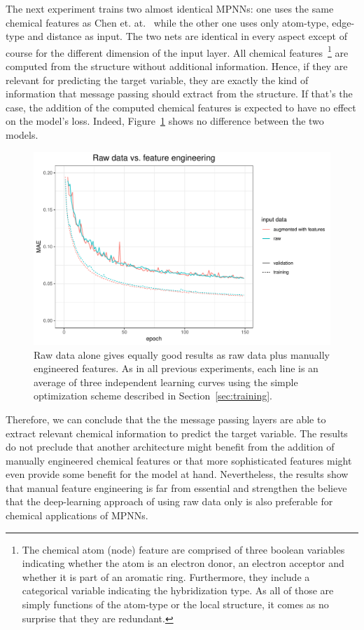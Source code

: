 The next experiment trains two almost identical MPNNs: one uses the same chemical features as Chen et. at.~\cite{Chen2019} while the other one uses only atom-type, edge-type and distance as input. The two nets are identical in every aspect except of course for the different dimension of the input layer. All chemical features~\footnote{
	The chemical atom (node) feature are comprised of three boolean variables indicating whether the atom is an electron donor, an electron acceptor and whether it is part of an aromatic ring. Furthermore, they include a categorical variable indicating the hybridization type. As all of those are simply functions of the atom-type or the local structure, it comes as no surprise that they are redundant.
	
}
are computed from the structure without additional information. Hence, if they are relevant for predicting the target variable, they are exactly the kind of information that message passing should extract from the structure. If that's the case, the addition of the computed chemical features is expected to have no effect on the model's loss. Indeed, Figure~\ref{fig:raw-data} shows no difference between the two models.

\begin{figure}[H]
	\includegraphics[width=\linewidth]{figures/raw-data}
	\caption{Raw data alone gives equally good results as raw data plus manually engineered features. As in all previous experiments, each line is an average of three independent learning curves using the simple optimization scheme described in Section~\ref{sec:training}.}
	\label{fig:raw-data}
\end{figure}

Therefore, we can conclude that the the message passing layers are able to extract relevant chemical information to predict the target variable. The results do not preclude that another architecture might benefit from the addition of manually engineered chemical features or that more sophisticated features might even provide some benefit for the model at hand. Nevertheless, the results show that manual feature engineering is far from essential and strengthen the believe that the deep-learning approach of using raw data only is also preferable for chemical applications of MPNNs.

